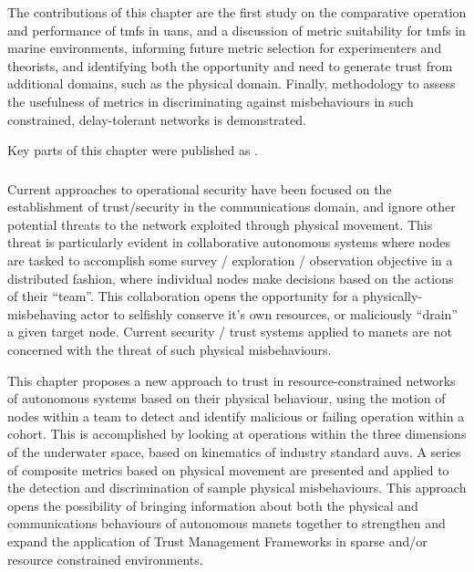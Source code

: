 The contributions of this chapter are the first study on the comparative operation and performance of \glspl{tmf} in \glspl{uan}, and a discussion of metric suitability for \glspl{tmf} in marine environments, informing future metric selection for experimenters and theorists, and identifying both the opportunity and need to generate trust from additional domains, such as the physical domain.
Finally, methodology to assess the usefulness of metrics in discriminating against misbehaviours in such constrained, delay-tolerant networks is demonstrated.

Key parts of this chapter were published as .

\subsubsection{}

Current approaches to operational security have been focused on the establishment of trust/security in the communications domain, and ignore other potential threats to the network exploited through physical movement.
This threat is particularly evident in collaborative autonomous systems where nodes are tasked to accomplish some survey / exploration / observation objective in a distributed fashion, where individual nodes make decisions based on the actions of their ``team''. 
This collaboration opens the opportunity for a physically-misbehaving actor to selfishly conserve it's own resources, or maliciously ``drain'' a given target node.
Current security / trust systems applied to \glspl{manet} are not concerned with the threat of such physical misbehaviours.

This chapter proposes a new approach to trust in resource-constrained networks of autonomous systems based on their physical behaviour, using the motion of nodes within a team to detect and identify malicious or failing operation within a cohort.
This is accomplished by looking at operations within the three dimensions of the underwater space, based on kinematics of industry standard \glspl{auv}.
A series of composite metrics based on physical movement are presented and applied to the detection and discrimination of sample physical misbehaviours.
This approach opens the possibility of bringing information about both the physical and communications behaviours of autonomous \glspl{manet} together to strengthen and expand the application of Trust Management Frameworks in sparse and/or resource constrained environments.

